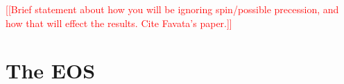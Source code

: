 \documentclass[twocolumn,prd,amssymb,aps,nofootinbib,showpacs,epsf]{revtex4}
\newcommand{\red}{\textcolor{red}}
\begin{document}
%
%

\red{[[Brief statement about how you will be ignoring spin/possible precession, and how that will effect the results. Cite Favata's paper.]]}


\section{The EOS}
\label{sec:eos}
\end{document}
